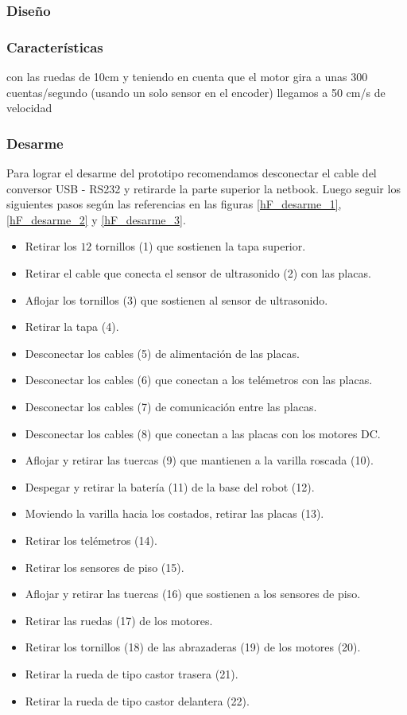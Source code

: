 \subsubsection{Dise\~no}
\label{h_prototipo_diseno}

\subsubsection{Caracter\'isticas}
\label{h_prototipo_caracteristicas}

con las ruedas de 10cm y teniendo en cuenta que el motor gira a unas 300 cuentas/segundo (usando un solo sensor en el encoder) llegamos a 50 cm/s de velocidad

\subsubsection{Desarme}
\label{h_prototipo_desarme}

Para lograr el desarme del prototipo recomendamos desconectar el cable del conversor USB - RS232 y
retirarde la parte superior la netbook.
Luego seguir los siguientes pasos seg\'un las referencias en las figuras \ref{hF_desarme_1}, \ref{hF_desarme_2} y \ref{hF_desarme_3}.

\begin{itemize}
 \item Retirar los $12$ tornillos (1) que sostienen la tapa superior.
 \item Retirar el cable que conecta el sensor de ultrasonido (2) con las placas.
 \item Aflojar los tornillos (3) que sostienen al sensor de ultrasonido.
 \item Retirar la tapa (4).
 \item Desconectar los cables (5) de alimentaci\'on de las placas.
 \item Desconectar los cables (6) que conectan a los tel\'emetros con las placas.
 \item Desconectar los cables (7) de comunicaci\'on entre las placas.
 \item Desconectar los cables (8) que conectan a las placas con los motores DC.
 \item Aflojar y retirar las tuercas (9) que mantienen a la varilla roscada (10).
 \item Despegar y retirar la bater\'ia (11) de la base del robot (12).
 \item Moviendo la varilla hacia los costados, retirar las placas (13).
 \item Retirar los tel\'emetros (14).
 \item Retirar los sensores de piso (15).
 \item Aflojar y retirar las tuercas (16) que sostienen a los sensores de piso.
 \item Retirar las ruedas (17) de los motores.
 \item Retirar los tornillos (18) de las abrazaderas (19) de los motores (20).
 \item Retirar la rueda de tipo castor trasera (21).
 \item Retirar la rueda de tipo castor delantera (22).
\end{itemize}

